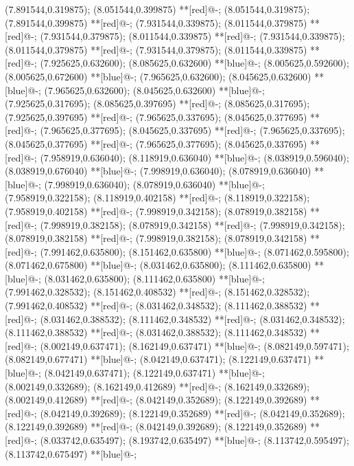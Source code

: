 (7.891544,0.319875); (8.051544,0.399875) **[red]@{-};
(8.051544,0.319875); (7.891544,0.399875) **[red]@{-};
(7.931544,0.339875); (8.011544,0.379875) **[red]@{-};
(7.931544,0.379875); (8.011544,0.339875) **[red]@{-};
(7.931544,0.339875); (8.011544,0.379875) **[red]@{-};
(7.931544,0.379875); (8.011544,0.339875) **[red]@{-};
(7.925625,0.632600); (8.085625,0.632600) **[blue]@{-};
(8.005625,0.592600); (8.005625,0.672600) **[blue]@{-};
(7.965625,0.632600); (8.045625,0.632600) **[blue]@{-};
(7.965625,0.632600); (8.045625,0.632600) **[blue]@{-};
(7.925625,0.317695); (8.085625,0.397695) **[red]@{-};
(8.085625,0.317695); (7.925625,0.397695) **[red]@{-};
(7.965625,0.337695); (8.045625,0.377695) **[red]@{-};
(7.965625,0.377695); (8.045625,0.337695) **[red]@{-};
(7.965625,0.337695); (8.045625,0.377695) **[red]@{-};
(7.965625,0.377695); (8.045625,0.337695) **[red]@{-};
(7.958919,0.636040); (8.118919,0.636040) **[blue]@{-};
(8.038919,0.596040); (8.038919,0.676040) **[blue]@{-};
(7.998919,0.636040); (8.078919,0.636040) **[blue]@{-};
(7.998919,0.636040); (8.078919,0.636040) **[blue]@{-};
(7.958919,0.322158); (8.118919,0.402158) **[red]@{-};
(8.118919,0.322158); (7.958919,0.402158) **[red]@{-};
(7.998919,0.342158); (8.078919,0.382158) **[red]@{-};
(7.998919,0.382158); (8.078919,0.342158) **[red]@{-};
(7.998919,0.342158); (8.078919,0.382158) **[red]@{-};
(7.998919,0.382158); (8.078919,0.342158) **[red]@{-};
(7.991462,0.635800); (8.151462,0.635800) **[blue]@{-};
(8.071462,0.595800); (8.071462,0.675800) **[blue]@{-};
(8.031462,0.635800); (8.111462,0.635800) **[blue]@{-};
(8.031462,0.635800); (8.111462,0.635800) **[blue]@{-};
(7.991462,0.328532); (8.151462,0.408532) **[red]@{-};
(8.151462,0.328532); (7.991462,0.408532) **[red]@{-};
(8.031462,0.348532); (8.111462,0.388532) **[red]@{-};
(8.031462,0.388532); (8.111462,0.348532) **[red]@{-};
(8.031462,0.348532); (8.111462,0.388532) **[red]@{-};
(8.031462,0.388532); (8.111462,0.348532) **[red]@{-};
(8.002149,0.637471); (8.162149,0.637471) **[blue]@{-};
(8.082149,0.597471); (8.082149,0.677471) **[blue]@{-};
(8.042149,0.637471); (8.122149,0.637471) **[blue]@{-};
(8.042149,0.637471); (8.122149,0.637471) **[blue]@{-};
(8.002149,0.332689); (8.162149,0.412689) **[red]@{-};
(8.162149,0.332689); (8.002149,0.412689) **[red]@{-};
(8.042149,0.352689); (8.122149,0.392689) **[red]@{-};
(8.042149,0.392689); (8.122149,0.352689) **[red]@{-};
(8.042149,0.352689); (8.122149,0.392689) **[red]@{-};
(8.042149,0.392689); (8.122149,0.352689) **[red]@{-};
(8.033742,0.635497); (8.193742,0.635497) **[blue]@{-};
(8.113742,0.595497); (8.113742,0.675497) **[blue]@{-};
